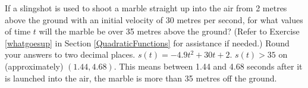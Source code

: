 {If a slingshot is used to shoot a marble straight up into the air from 2 metres above the ground with an initial velocity of 30 metres per second, for what values of time $t$ will the marble be over 35 metres above the ground? (Refer to Exercise \ref{whatgoesup} in Section \ref{QuadraticFunctions} for assistance if needed.)  Round your answers to two decimal places.}
{$s(t) = -4.9t^2 + 30t + 2$.  $s(t) > 35$ on (approximately)  $(1.44, 4.68)$.  This means between 1.44 and 4.68 seconds after it is launched into the air, the marble is more than 35 metres off the ground. }